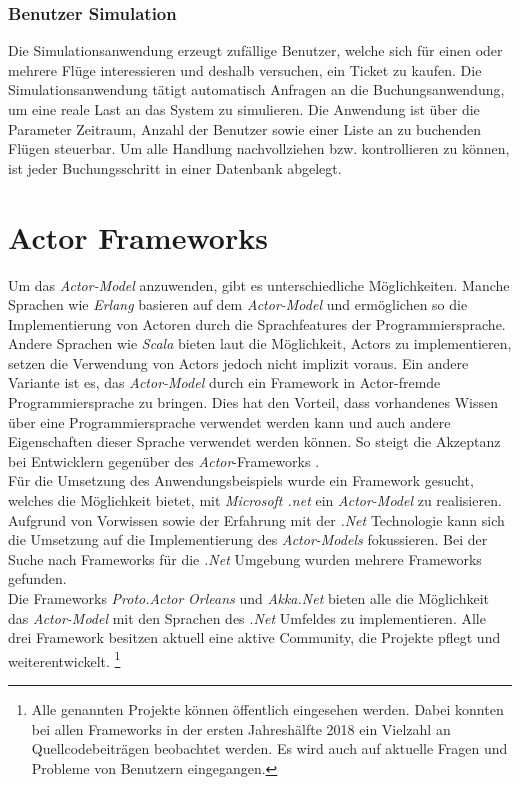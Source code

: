\subsubsection{Benutzer Simulation}
Die Simulationsanwendung erzeugt zufällige Benutzer, welche sich für einen oder mehrere Flüge interessieren und deshalb versuchen, ein Ticket zu kaufen. Die Simulationsanwendung tätigt automatisch Anfragen an die Buchungsanwendung, um eine reale Last an das System zu simulieren. Die Anwendung ist über die Parameter Zeitraum, Anzahl der Benutzer sowie einer Liste an zu buchenden Flügen steuerbar.  
Um alle Handlung nachvollziehen bzw. kontrollieren zu können, ist jeder Buchungsschritt in einer Datenbank abgelegt.


\section{Actor Frameworks}\label{sec:ActorFrameworks}
Um das \textit{Actor-Model} anzuwenden, gibt es unterschiedliche Möglichkeiten. Manche Sprachen wie \textit{Erlang} basieren auf dem \textit{Actor-Model} und ermöglichen so die Implementierung von Actoren \citep{actorComparativeAnalysis} durch die Sprachfeatures der Programmiersprache. Andere Sprachen wie \textit{Scala} bieten laut \cite{haller2012actors} die Möglichkeit, Actors zu implementieren, setzen die Verwendung von Actors jedoch nicht implizit voraus. Ein andere Variante ist es, das \textit{Actor-Model} durch ein Framework in Actor-fremde Programmiersprache zu bringen. Dies hat den Vorteil, dass vorhandenes Wissen über eine Programmiersprache verwendet werden kann und auch andere Eigenschaften dieser Sprache verwendet werden können. So steigt die Akzeptanz bei Entwicklern gegenüber des \textit{Actor}-Frameworks \citep{lee2006problem}. \\
Für die Umsetzung des Anwendungsbeispiels wurde ein Framework gesucht, welches die Möglichkeit bietet, mit \textit{Microsoft .net} ein \textit{Actor-Model} zu realisieren. Aufgrund von Vorwissen sowie der Erfahrung mit der \textit{.Net} Technologie kann sich die Umsetzung auf die Implementierung des \textit{Actor-Models} fokussieren. Bei der Suche nach Frameworks für die \textit{.Net} Umgebung wurden mehrere Frameworks gefunden. \\
Die Frameworks \textit{Proto.Actor} \textit{Orleans} und \textit{Akka.Net} bieten alle die Möglichkeit das \textit{Actor-Model} mit den Sprachen des \textit{.Net} Umfeldes zu implementieren. Alle drei Framework besitzen aktuell eine aktive Community, die Projekte pflegt und weiterentwickelt.
\footnote{Alle genannten Projekte können öffentlich eingesehen werden. Dabei konnten bei allen Frameworks in der ersten Jahreshälfte 2018 ein Vielzahl an Quellcodebeiträgen beobachtet werden. Es wird auch auf aktuelle Fragen und Probleme von Benutzern eingegangen.}

